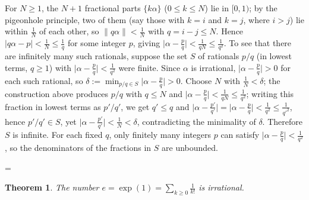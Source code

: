 \documentclass[11pt]{article}
\makeatletter
\theoremstyle{ntstyle}
\newtheorem{theorem}{Theorem}[subsection]
\let\nt@closedisplay\]
\def\nt@guardedclose{\@ifnextchar\par{\nt@closeafterpar}{\@ifnextchar\end{\postdisplaypenalty\@M\nt@closedisplay}{\nt@closedisplay}}}
\def\nt@closeafterpar\par{\@ifnextchar\par{\nt@closeafterpar}{\@ifnextchar\end{\postdisplaypenalty\@M\nt@closedisplay\par}{\nt@closedisplay\par}}}
\renewenvironment{proof}[1][\proofname]{\par
  \pushQED{\qed}\normalfont\topsep\medskipamount\edef\nt@afterproof{\@endparpenalty=\the\@endparpenalty\relax}\@beginparpenalty\@M\@endparpenalty\@M\let\]\nt@guardedclose\trivlist\item[]\textit{#1\@addpunct{.}} \ignorespaces}{\ifvmode\addpenalty\@M\fi\popQED\nt@afterproof\endtrivlist\@endpefalse}
\makeatother
\begin{document}
\begin{proof} For $N\ge1$, the $N+1$ fractional parts
	$\{k\alpha\}$ ($0\le k\le N$) lie in $[0,1)$; by the pigeonhole principle, two of
	them (say those with $k=i$ and $k=j$, where $i>j$) lie within $\tfrac{1}{N}$ of each other, so $\lVert q\alpha\rVert <
		\tfrac{1}{N}$ with $q = i-j\le N$. Hence $|q\alpha - p| <
		\tfrac{1}{N}\le\tfrac{1}{q}$ for some integer $p$, giving $\big|\alpha -
		\tfrac{p}{q}\big| < \tfrac{1}{qN}\le\tfrac{1}{q^2}$. To see that there are infinitely many such rationals, suppose the set $S$ of rationals $p/q$ (in lowest terms, $q\ge1$) with $\big|\alpha-\tfrac{p}{q}\big|<\tfrac{1}{q^2}$ were finite. Since $\alpha$ is irrational, $\big|\alpha-\tfrac{p}{q}\big|>0$ for each such rational, so $\delta:=\min_{p/q\in S}\big|\alpha-\tfrac{p}{q}\big|>0$. Choose $N$ with $\tfrac{1}{N}<\delta$; the construction above produces $p/q$ with $q\le N$ and $\big|\alpha-\tfrac{p}{q}\big|<\tfrac{1}{qN}\le\tfrac{1}{q^2}$; writing this fraction in lowest terms as $p'/q'$, we get $q'\le q$ and
	$\big|\alpha-\tfrac{p'}{q'}\big|=\big|\alpha-\tfrac{p}{q}\big|<\tfrac{1}{q^{2}}\le\tfrac{1}{q'^{2}}$,
	hence $p'/q'\in S$, yet
	$\big|\alpha-\tfrac{p'}{q'}\big|<\tfrac{1}{N}<\delta$, contradicting
	the minimality of $\delta$. Therefore $S$ is infinite. For each fixed
	$q$, only finitely many integers $p$ can satisfy
	$\big|\alpha-\tfrac{p}{q}\big|<\tfrac{1}{q^2}$, so the denominators of
	the fractions in $S$ are unbounded.

\end{proof}
\begin{theorem}\label{thm:10.1.2} The number
	$e=\exp(1)=\sum_{k\ge0}\tfrac{1}{k!}$ is irrational.

\end{theorem}
\end{document}
